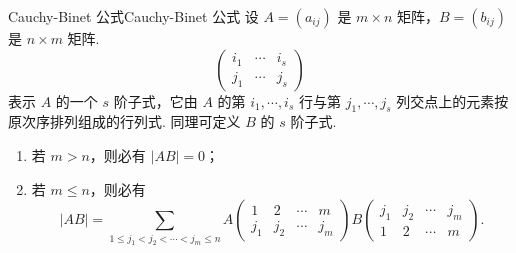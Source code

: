 \begin{theorem}{Cauchy-Binet 公式}{Cauchy-Binet 公式}
    设 $A = (a_{ij})$ 是 $m \times n$ 矩阵，$B = (b_{ij})$ 是 $n \times m$ 矩阵.
    $$
    \begin{pmatrix}
    i_1 & \cdots & i_s \\
    j_1 & \cdots & j_s
    \end{pmatrix}
    $$
    表示 $A$ 的一个 $s$ 阶子式，它由 $A$ 的第 $i_1, \cdots, i_s$ 行与第 $j_1, \cdots, j_s$ 列交点上的元素按原次序排列组成的行列式. 同理可定义 $B$ 的 $s$ 阶子式.
    \begin{enumerate}
        \item 若 $m > n$，则必有 $|AB| = 0$；
        \item 若 $m \leqslant n$，则必有
        $$
        |AB| = \sum_{1 \leqslant j_1 < j_2 < \cdots < j_m \leqslant n} A
        \begin{pmatrix}
        1 & 2 & \cdots & m \\
        j_1 & j_2 & \cdots & j_m
        \end{pmatrix}
        B
        \begin{pmatrix}
        j_1 & j_2 & \cdots & j_m \\
        1 & 2 & \cdots & m
        \end{pmatrix}.
        $$
    \end{enumerate}
\end{theorem}

